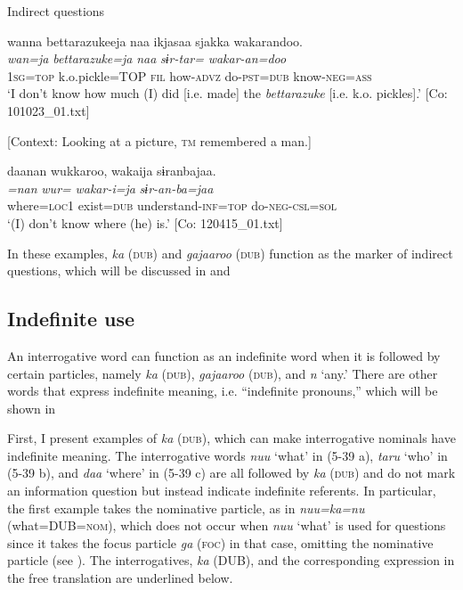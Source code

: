\ea \label{ex:5:38}   Indirect questions

 \ea \label{ex:5:a} %
\glll  wanna  {\textbar}bettarazukee{\textbar}ja  naa  ikjasaa  sjakka  wakarandoo.\\
\textit{wan=ja}  \textit{bettarazuke=ja}  \textit{naa}  \textit{}  \textit{sɨr-tar=}  \textit{wakar-an=doo}\\
1\textsc{sg}=\textsc{top}  k.o.pickle=TOP  \textsc{fil}  how-\textsc{advz}  do-\textsc{pst}=\textsc{dub}  know-\textsc{neg}=\textsc{ass}\\
\glt ‘I don’t know how much (I) did [i.e. made] the \textit{bettarazuke} [i.e. k.o. pickles].’ [Co: 101023\_01.txt]

 \ex \label{ex:5:b} [Context: Looking at a picture, \textsc{tm} remembered a man.]

\glll  daanan  wukkaroo,  wakaija  sɨranbajaa.\\
\textit{=nan}  \textit{wur=}  \textit{wakar-i=ja}  \textit{sɨr-an-ba=jaa}\\
where=\textsc{loc}1  exist=\textsc{dub}  understand-\textsc{inf}=\textsc{top}  do-\textsc{neg}-\textsc{csl}=\textsc{sol}\\
\glt ‘(I) don’t know where (he) is.’ [Co: 120415\_01.txt]
\z
\z

In these examples, \textit{ka} (\textsc{dub}) and \textit{gajaaroo} (\textsc{dub}) function as the marker of indirect questions, which will be discussed in  and 

\subsection{Indefinite use}

An interrogative word can function as an indefinite word when it is followed by certain particles, namely \textit{ka} (\textsc{dub}), \textit{gajaaroo} (\textsc{dub}), and \textit{n} ‘any.’ There are other words that express indefinite meaning, i.e. “indefinite pronouns,” which will be shown in 

  First, I present examples of \textit{ka} (\textsc{dub}), which can make interrogative nominals have indefinite meaning. The interrogative words \textit{nuu} ‘what’ in (5-39 a), \textit{taru} ‘who’ in (5-39 b), and \textit{daa} ‘where’ in (5-39 c) are all followed by \textit{ka} (\textsc{dub}) and do not mark an information question but instead indicate indefinite referents. In particular, the first example takes the nominative particle, as in \textit{nuu=ka=nu} (what=DUB=\textsc{nom}), which does not occur when \textit{nuu} ‘what’ is used for questions since it takes the focus particle \textit{ga} (\textsc{foc}) in that case, omitting the nominative particle (see ). The interrogatives, \textit{ka} (DUB), and the corresponding expression in the free translation are underlined below.

